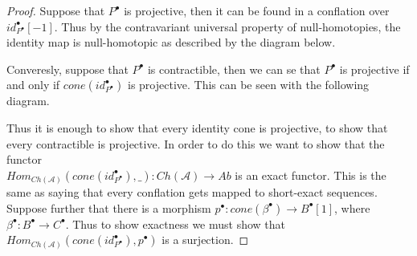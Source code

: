 \documentclass[11pt]{article}
\theoremstyle{definition}
\theoremstyle{remark}
\newcommand{\chain}[1]{#1^{\bullet}}
\begin{document}
            \begin{proof}
                Suppose that $\chain{P}$ is projective, then it can be found in a conflation over $\chain{id_{\chain{P}}}[-1]$. Thus by the contravariant universal property of null-homotopies, the identity map is null-homotopic as described by the diagram below.
                \begin{center}
                \end{center}

                Converesly, suppose that $\chain{P}$ is contractible, then we can se that $\chain{P}$ is projective if and only if $cone(\chain{id_{\chain{P}}})$ is projective. This can be seen with the following diagram.

                \begin{center}
                \end{center}
                
                Thus it is enough to show that every identity cone is projective, to show that every contractible is projective. In order to do this we want to show that the functor \\$Hom_{Ch(\mathcal{A})}(cone(\chain{id_{\chain{P}}}),\_):Ch(\mathcal{A})\rightarrow Ab$ is an exact functor. This is the same as saying that every conflation gets mapped to short-exact sequences.
                Suppose further that there is a morphism $\chain{p}:cone(\chain{\beta})\rightarrow\chain{B}[1]$, where $\chain{\beta}:\chain{B}\rightarrow\chain{C}$. Thus to show exactness we must show that $Hom_{Ch(\mathcal{A})}(cone(\chain{id_{\chain{P}}}),\chain{p})$ is a surjection.


\end{proof}
\end{document}

